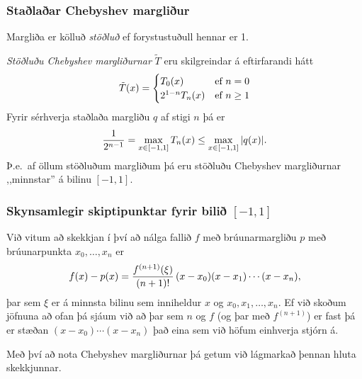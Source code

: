 \documentclass[a4paper,10pt,icelandic]{sphinxmanual}
\begin{document}

\subsubsection{Staðlaðar Chebyshev margliður}
\label{kafli03:stalaar-chebyshev-margliur}\label{kafli03:index-16}
Margliða er kölluð \emph{stöðluð} ef forystustuðull hennar er 1.

\emph{Stöðluðu Chebyshev margliðurnar} \(\tilde T\) eru skilgreindar á eftirfarandi hátt
\begin{gather}
\begin{split}\tilde T(x) =
    \begin{cases}
      T_0(x) & \text{ef } n = 0 \\
      2^{1-n}T_n(x)   & \text{ef } n\geq 1              \end{cases}\end{split}\notag
\end{gather}
Fyrir sérhverja staðlaða margliðu \(q\) af stigi
\(n\) þá er
\begin{gather}
\begin{split}\frac 1{2^{n-1}} = \max_{x\in [-1,1]} T_n(x) \leq \max_{x\in[-1,1]} |q(x)|.\end{split}\notag
\end{gather}
Þ.e. af öllum stöðluðum margliðum þá eru stöðluðu Chebyshev margliðurnar
,,minnstar” á bilinu \([-1,1]\).


\subsubsection{Skynsamlegir skiptipunktar fyrir bilið \([-1,1]\)}
\label{kafli03:skynsamlegir-skiptipunktar-fyrir-bili}
Við vitum að skekkjan í því að nálga fallið \(f\) með
brúunarmargliðu \(p\) með brúunarpunkta \(x_0,\ldots,x_n\) er
\begin{gather}
\begin{split}f(x)-p(x) = \frac{f^{(n+1)}(\xi)}{(n+1)!}\, (x-x_0)(x-x_1)\cdots (x-x_n),\end{split}\notag
\end{gather}
þar sem \(\xi\) er á minnsta bilinu sem inniheldur \(x\) og
\(x_0,x_1,\ldots,x_n\). Ef við skoðum jöfnuna að ofan þá sjáum við
að þar sem \(n\) og \(f\) (og þar með \(f^{(n+1)}\)) er fast
þá er stæðan \((x-x_0)\cdots(x-x_n)\) það eina sem við höfum
einhverja stjórn á.

Með því að nota Chebyshev margliðurnar þá getum við lágmarkað þennan
hluta skekkjunnar.
\end{document}
